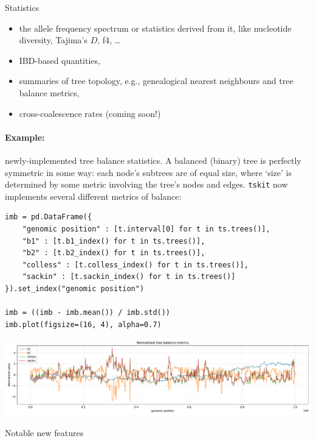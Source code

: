 \documentclass[landscape,a0paper,fontscale=0.4]{baposter}
\newcommand{\tskit}{{\texttt{tskit}}}
\newcommand{\compresslist}{%
 \setlength{\itemsep}{1pt}%
 \setlength{\parskip}{0pt}%
 \setlength{\parsep}{0pt}%
 }
\begin{document}
\begin{poster}
\begin{posterbox}[name=stats,column=3,row=0,span=1]{Statistics}
\begin{itemize} \compresslist
    \item the allele frequency spectrum or statistics derived from it,
        like nucleotide diversity, Tajima's $D$, f4, \ldots
    \item IBD-based quantities,
    \item summaries of tree topology,
        e.g., genealogical nearest neighbours and tree balance metrics,
    \item cross-coalescence rates (coming soon!)
\end{itemize}

\paragraph{Example:} newly-implemented tree balance statistics. A balanced
(binary) tree is perfectly symmetric in some way: each node's
subtrees are of equal size, where `size'
is determined by some metric involving the tree's nodes and edges. \tskit{}
now implements several different metrics of balance:

\begin{verbatim}
imb = pd.DataFrame({
    "genomic position" : [t.interval[0] for t in ts.trees()],
    "b1" : [t.b1_index() for t in ts.trees()],
    "b2" : [t.b2_index() for t in ts.trees()],
    "colless" : [t.colless_index() for t in ts.trees()],
    "sackin" : [t.sackin_index() for t in ts.trees()]
}).set_index("genomic position")

imb = ((imb - imb.mean()) / imb.std())
imb.plot(figsize=(16, 4), alpha=0.7)
\end{verbatim}
\includegraphics[width=\textwidth]{tree_balance}

\end{posterbox}


\begin{posterbox}[name=operations,column=3,above=bottom,span=1]{Notable new features}


\end{posterbox}
\end{poster}
\end{document}

